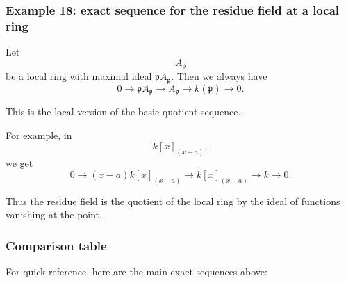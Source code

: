 \documentclass[12pt,a4paper]{article}
\theoremstyle{notespace}
\newcommand{\mf}{\mathfrak}
\theoremstyle{definition}
\begin{document}
\subsubsection{Example 18: exact sequence for the residue field at a local ring}

Let
\[
A_{\mf p}
\]
be a local ring with maximal ideal \(\mf p A_{\mf p}\). Then we always have
\[
0 \longrightarrow \mf p A_{\mf p} \longrightarrow A_{\mf p} \longrightarrow k(\mf p) \longrightarrow 0.
\]

This is the local version of the basic quotient sequence.

For example, in
\[
k[x]_{(x-a)},
\]
we get
\[
0 \longrightarrow (x-a)k[x]_{(x-a)} \longrightarrow k[x]_{(x-a)} \longrightarrow k \longrightarrow 0.
\]

Thus the residue field is the quotient of the local ring by the ideal of functions vanishing at the point.

\subsubsection{Comparison table}

For quick reference, here are the main exact sequences above:
\end{document}

